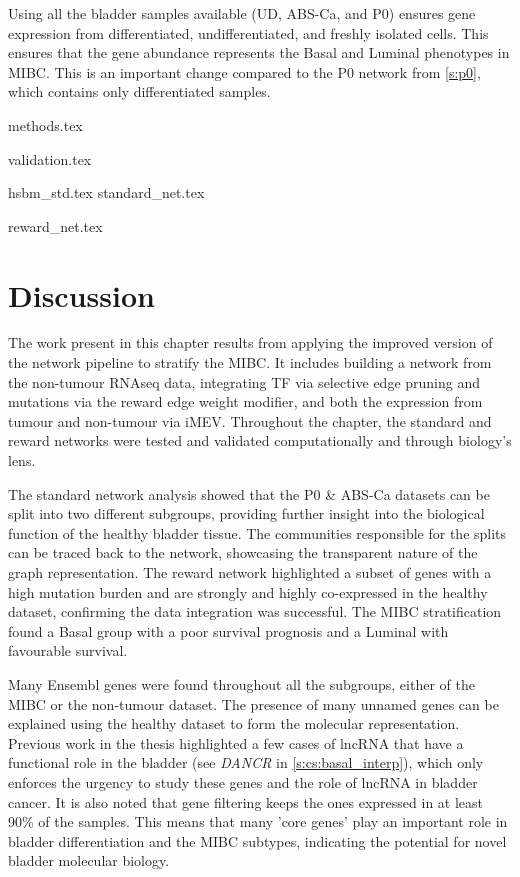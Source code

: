 Using all the bladder samples available (UD, ABS-Ca, and P0) ensures gene expression from differentiated, undifferentiated, and freshly isolated cells. This ensures that the gene abundance represents the Basal and Luminal phenotypes in MIBC. This is an important change compared to the P0 network from \cref{s:p0}, which contains only differentiated samples.


{methods.tex}

{validation.tex}

{hsbm_std.tex}
{standard_net.tex}

{reward_net.tex}

\section{Discussion}

The work present in this chapter results from applying the improved version of the network pipeline to stratify the MIBC. It includes building a network from the non-tumour RNAseq data, integrating TF via selective edge pruning and mutations via the reward edge weight modifier, and both the expression from tumour and non-tumour via iMEV. Throughout the chapter, the standard and reward networks were tested and validated computationally and through biology's lens. 

The standard network analysis showed that the P0 \& ABS-Ca datasets can be split into two different subgroups, providing further insight into the biological function of the healthy bladder tissue. The communities responsible for the splits can be traced back to the network, showcasing the transparent nature of the graph representation. The reward network highlighted a subset of genes with a high mutation burden and are strongly and highly co-expressed in the healthy dataset, confirming the data integration was successful. The MIBC stratification found a Basal group with a poor survival prognosis and a Luminal with favourable survival.

Many Ensembl genes were found throughout all the subgroups, either of the MIBC or the non-tumour dataset. The presence of many unnamed genes can be explained using the healthy dataset to form the molecular representation. Previous work in the thesis highlighted a few cases of \acrfull{lncRNA} that have a functional role in the bladder (see \textit{DANCR} in \cref{s:cs:basal_interp}), which only enforces the urgency to study these genes and the role of lncRNA in bladder cancer. It is also noted that gene filtering keeps the ones expressed in at least 90\% of the samples. This means that many 'core genes' play an important role in bladder differentiation and the MIBC subtypes, indicating the potential for novel bladder molecular biology. 


